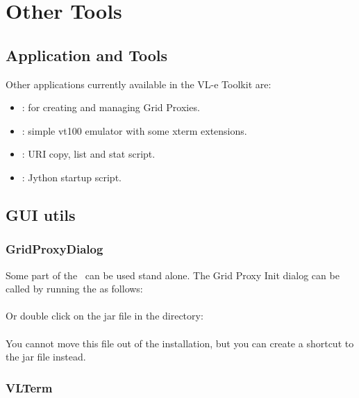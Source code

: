 %
%

\chapter{Other Tools}
\label{chap:other_tools}

\section{Application and Tools} 

Other applications currently available in the VL-e Toolkit are:

\begin{itemize}
  \item {}: for creating and managing Grid Proxies. 
  \item {}:		    simple vt100 emulator with some
  xterm extensions.  
  \item {}: URI copy, list and stat script.
  \item {}:		Jython startup script. 
\end{itemize}

\section{GUI utils}

\subsection{GridProxyDialog}

Some part of the \vbrowser\ can be used stand alone. 
The Grid Proxy Init dialog can be called by running the
 as follows:\\

	\tab {}\\

Or double click on the jar file in the  directory:\\

	\tab {}\\
	
You cannot move this file out of the installation, but you can create a shortcut
to the jar file instead. 

\subsection{VLTerm}
\label{section:vlterm}

